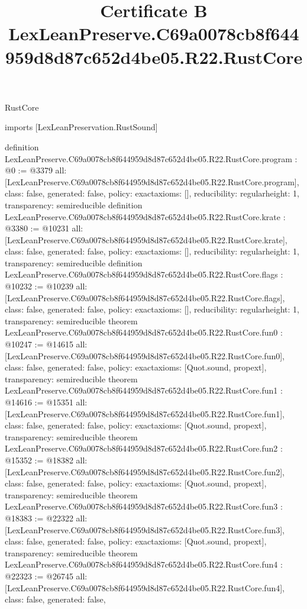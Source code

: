 \begin{lexlean}{RustCore}
\title{Certificate B LexLeanPreserve.C69a0078cb8f644959d8d87c652d4be05.R22.RustCore}
\begin{coremodule}
imports [LexLeanPreservation.RustSound]

definition LexLeanPreserve.C69a0078cb8f644959d8d87c652d4be05.R22.RustCore.program : @0 := @3379 {
  all: [LexLeanPreserve.C69a0078cb8f644959d8d87c652d4be05.R22.RustCore.program],
  class: false,
  generated: false,
  policy: exact{axioms: []},
  reducibility: regular{height: 1},
  transparency: semireducible
}
definition LexLeanPreserve.C69a0078cb8f644959d8d87c652d4be05.R22.RustCore.krate : @3380 := @10231 {
  all: [LexLeanPreserve.C69a0078cb8f644959d8d87c652d4be05.R22.RustCore.krate],
  class: false,
  generated: false,
  policy: exact{axioms: []},
  reducibility: regular{height: 1},
  transparency: semireducible
}
definition LexLeanPreserve.C69a0078cb8f644959d8d87c652d4be05.R22.RustCore.flags : @10232 := @10239 {
  all: [LexLeanPreserve.C69a0078cb8f644959d8d87c652d4be05.R22.RustCore.flags],
  class: false,
  generated: false,
  policy: exact{axioms: []},
  reducibility: regular{height: 1},
  transparency: semireducible
}
theorem LexLeanPreserve.C69a0078cb8f644959d8d87c652d4be05.R22.RustCore.fun0 : @10247 := @14615 {
  all: [LexLeanPreserve.C69a0078cb8f644959d8d87c652d4be05.R22.RustCore.fun0],
  class: false,
  generated: false,
  policy: exact{axioms: [Quot.sound, propext]},
  transparency: semireducible
}
theorem LexLeanPreserve.C69a0078cb8f644959d8d87c652d4be05.R22.RustCore.fun1 : @14616 := @15351 {
  all: [LexLeanPreserve.C69a0078cb8f644959d8d87c652d4be05.R22.RustCore.fun1],
  class: false,
  generated: false,
  policy: exact{axioms: [Quot.sound, propext]},
  transparency: semireducible
}
theorem LexLeanPreserve.C69a0078cb8f644959d8d87c652d4be05.R22.RustCore.fun2 : @15352 := @18382 {
  all: [LexLeanPreserve.C69a0078cb8f644959d8d87c652d4be05.R22.RustCore.fun2],
  class: false,
  generated: false,
  policy: exact{axioms: [Quot.sound, propext]},
  transparency: semireducible
}
theorem LexLeanPreserve.C69a0078cb8f644959d8d87c652d4be05.R22.RustCore.fun3 : @18383 := @22322 {
  all: [LexLeanPreserve.C69a0078cb8f644959d8d87c652d4be05.R22.RustCore.fun3],
  class: false,
  generated: false,
  policy: exact{axioms: [Quot.sound, propext]},
  transparency: semireducible
}
theorem LexLeanPreserve.C69a0078cb8f644959d8d87c652d4be05.R22.RustCore.fun4 : @22323 := @26745 {
  all: [LexLeanPreserve.C69a0078cb8f644959d8d87c652d4be05.R22.RustCore.fun4],
  class: false,
  generated: false,
}
\end{coremodule}
\end{lexlean}
